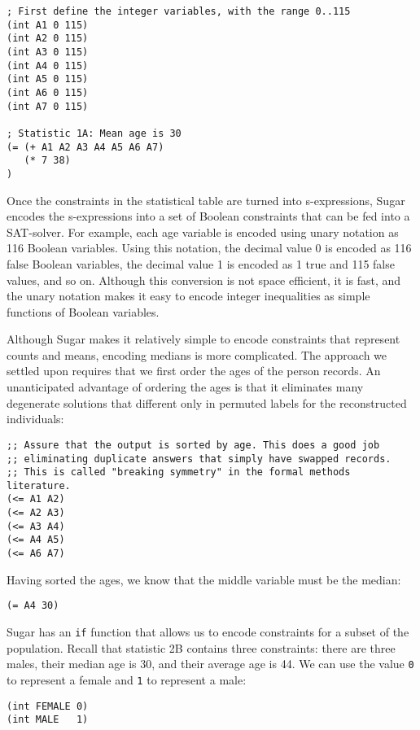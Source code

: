 \documentclass[runningheads]{llncs}
\begin{document}
\begin{Verbatim}
; First define the integer variables, with the range 0..115
(int A1 0 115)
(int A2 0 115)
(int A3 0 115)
(int A4 0 115)
(int A5 0 115)
(int A6 0 115)
(int A7 0 115)

; Statistic 1A: Mean age is 30
(= (+ A1 A2 A3 A4 A5 A6 A7)
   (* 7 38)
)
\end{Verbatim}
Once the constraints in the statistical table are turned into
s-expressions, Sugar encodes the s-expressions into a
set of Boolean constraints that can be fed into a SAT-solver. For example, each age variable
is encoded using unary notation as 116 Boolean variables. Using this
notation, the decimal value 0 is encoded as 116 false Boolean
variables, the decimal value 1 is encoded as 1 true and 115 false
values, and so on. Although this
conversion is not space efficient, it is fast, and the unary notation makes
it easy to encode integer inequalities as simple functions of Boolean
variables. 

Although Sugar makes it relatively simple to encode constraints that
represent counts and means, encoding medians is more complicated. The
approach we settled upon requires that we first order the ages of the
person records. An unanticipated advantage of ordering the ages is
that it eliminates many degenerate solutions that different only in
permuted labels for the reconstructed individuals:

\begin{Verbatim}
;; Assure that the output is sorted by age. This does a good job 
;; eliminating duplicate answers that simply have swapped records.
;; This is called "breaking symmetry" in the formal methods literature. 
(<= A1 A2)
(<= A2 A3)
(<= A3 A4)
(<= A4 A5)
(<= A6 A7)
\end{Verbatim}

Having sorted the ages, we know that the middle variable must
be the median:

\begin{Verbatim}
(= A4 30)
\end{Verbatim}

Sugar has an \texttt{if} function that allows us to encode constraints
for a subset of the population. Recall that statistic 2B contains three
constraints: there are three males, their median age is 30, and their
average age is 44. We can use the value \texttt{0} to represent a female
and \texttt{1} to represent a male:

\begin{Verbatim}
(int FEMALE 0)
(int MALE   1)
\end{Verbatim} 
\end{document}
